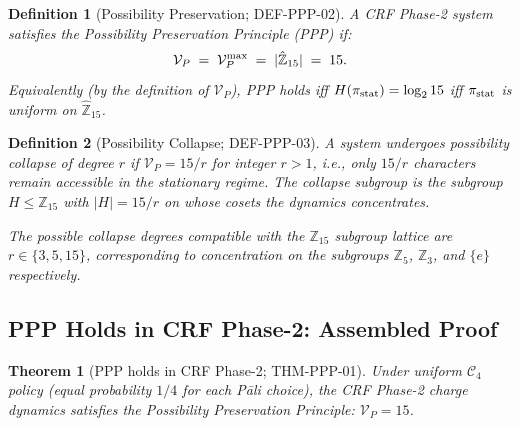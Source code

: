 \documentclass[12pt, a4paper]{article}
\newtheorem{theorem}{Theorem}[section]
\newtheorem{definition}{Definition}[section]
\begin{document}
\begin{definition}[Possibility Preservation; DEF-PPP-02]
\label{def:PPP}
A CRF Phase-2 system \emph{satisfies the Possibility Preservation
Principle (PPP)} if:
\begin{equation}
  \mathcal{V}_P \;=\; \mathcal{V}_P^{\rm max} \;=\;
  |\hat{\mathbb{Z}}_{15}| \;=\; 15.
  \label{eq:PPP-condition}
\end{equation}
Equivalently (by the definition of $\mathcal{V}_P$), PPP holds iff
$H(\pi_{\rm stat}) = \log_2 15$ iff $\pi_{\rm stat}$ is uniform on
$\hat{\mathbb{Z}}_{15}$.
\end{definition}

\begin{definition}[Possibility Collapse; DEF-PPP-03]
\label{def:collapse}
A system undergoes \emph{possibility collapse of degree $r$} if
$\mathcal{V}_P = 15/r$ for integer $r > 1$, i.e., only $15/r$
characters remain accessible in the stationary regime. The
\emph{collapse subgroup} is the subgroup
$H \leq \mathbb{Z}_{15}$ with $|H| = 15/r$ on whose cosets the
dynamics concentrates.

The possible collapse degrees compatible with the
$\mathbb{Z}_{15}$ subgroup lattice are $r \in \{3, 5, 15\}$,
corresponding to concentration on the subgroups
$\mathbb{Z}_5$, $\mathbb{Z}_3$, and $\{e\}$ respectively.
\end{definition}

\subsection{PPP Holds in CRF Phase-2: Assembled Proof}
\label{sec:thm-ppp01}

\begin{theorem}[PPP holds in CRF Phase-2; THM-PPP-01]
\label{thm:PPP01}
Under uniform $\mathcal{C}_4$ policy (equal probability $1/4$ for
each Pāli choice), the CRF Phase-2 charge dynamics satisfies the
Possibility Preservation Principle: $\mathcal{V}_P = 15$.
\end{theorem}
\end{document}
